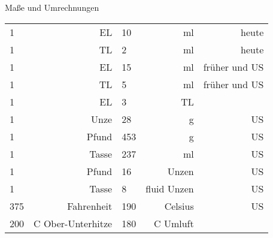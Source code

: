 Maße und Umrechnungen

\begin{tabularx}{\linewidth}{lr|lr|r}
  1 & EL                &  10 & ml          &         heute \\
  1 & TL                &   2 & ml          &         heute \\
  1 & EL                &  15 & ml          & früher und US \\
  1 & TL                &   5 & ml          & früher und US \\
  1 & EL                &   3 & TL          &               \\
  1 & Unze              &  28 & g           &            US \\
  1 & Pfund             & 453 & g           &            US \\
  1 & Tasse             & 237 & ml          &            US \\
  1 & Pfund             &  16 & Unzen       &            US \\
  1 & Tasse             &   8 & fluid Unzen &            US \\
375 & Fahrenheit        & 190 & Celsius     &            US \\
200 & C Ober-Unterhitze & 180 & C Umluft    &               \\
\end{tabularx}

\vfill

